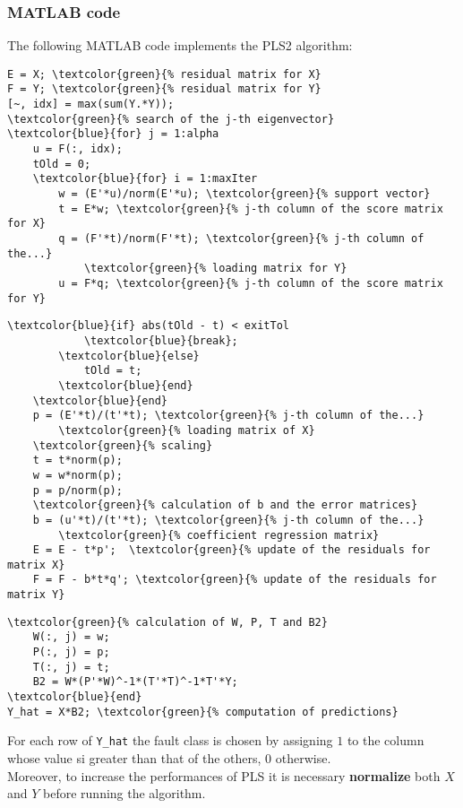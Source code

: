 \begin{frame}[fragile]
	\frametitle{MATLAB code}
	The following MATLAB code implements the PLS2 algorithm:
	\begin{Verbatim}[tabsize=4, commandchars=\\\{\}, frame=topline]
E = X; \textcolor{green}{% residual matrix for X}
F = Y; \textcolor{green}{% residual matrix for Y}
[~, idx] = max(sum(Y.*Y));
\textcolor{green}{% search of the j-th eigenvector}
\textcolor{blue}{for} j = 1:alpha
	u = F(:, idx);
	tOld = 0;
	\textcolor{blue}{for} i = 1:maxIter
		w = (E'*u)/norm(E'*u); \textcolor{green}{% support vector}
		t = E*w; \textcolor{green}{% j-th column of the score matrix for X}
		q = (F'*t)/norm(F'*t); \textcolor{green}{% j-th column of the...}
			\textcolor{green}{% loading matrix for Y}
		u = F*q; \textcolor{green}{% j-th column of the score matrix for Y}
	\end{Verbatim}
\end{frame}

\begin{frame}[fragile]
	\begin{Verbatim}[tabsize=4, commandchars=\\\{\}]
		\textcolor{blue}{if} abs(tOld - t) < exitTol
			\textcolor{blue}{break};
		\textcolor{blue}{else}
			tOld = t;
		\textcolor{blue}{end}
	\textcolor{blue}{end}
	p = (E'*t)/(t'*t); \textcolor{green}{% j-th column of the...}
		\textcolor{green}{% loading matrix of X}
	\textcolor{green}{% scaling}
	t = t*norm(p);
	w = w*norm(p);
	p = p/norm(p);
	\textcolor{green}{% calculation of b and the error matrices}
	b = (u'*t)/(t'*t); \textcolor{green}{% j-th column of the...}
	    \textcolor{green}{% coefficient regression matrix}
	E = E - t*p';  \textcolor{green}{% update of the residuals for matrix X}
	F = F - b*t*q'; \textcolor{green}{% update of the residuals for matrix Y}
	\end{Verbatim}
\end{frame}

\begin{frame}[fragile]
	\begin{Verbatim}[tabsize=4, commandchars=\\\{\}, frame=bottomline]
	\textcolor{green}{% calculation of W, P, T and B2}
	W(:, j) = w;
	P(:, j) = p;
	T(:, j) = t;
	B2 = W*(P'*W)^-1*(T'*T)^-1*T'*Y;
\textcolor{blue}{end}
Y_hat = X*B2; \textcolor{green}{% computation of predictions}
	\end{Verbatim}
For each row of \verb|Y_hat| the fault class is chosen by assigning $1$ to the column whose value si greater than that of the others, $0$ otherwise. \\Moreover, to increase the performances of PLS it is necessary \textbf{normalize} both $X$ and $Y$ before running the algorithm.

\end{frame}
